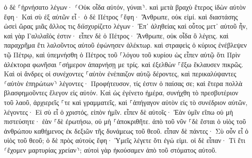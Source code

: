 \documentclass[twoside, 9pt]{extreport}
\begin{document}
ὁ δὲ ⸀ἠρνήσατο λέγων· ⸂Οὐκ οἶδα αὐτόν, γύναι⸃. 
καὶ μετὰ βραχὺ ἕτερος ἰδὼν αὐτὸν ἔφη· Καὶ σὺ ἐξ αὐτῶν εἶ· ὁ δὲ Πέτρος ⸀ἔφη· Ἄνθρωπε, οὐκ εἰμί. 
καὶ διαστάσης ὡσεὶ ὥρας μιᾶς ἄλλος τις διϊσχυρίζετο λέγων· Ἐπ᾽ ἀληθείας καὶ οὗτος μετ᾽ αὐτοῦ ἦν, καὶ γὰρ Γαλιλαῖός ἐστιν· 
εἶπεν δὲ ὁ Πέτρος· Ἄνθρωπε, οὐκ οἶδα ὃ λέγεις. καὶ παραχρῆμα ἔτι λαλοῦντος αὐτοῦ ἐφώνησεν ἀλέκτωρ. 
καὶ στραφεὶς ὁ κύριος ἐνέβλεψεν τῷ Πέτρῳ, καὶ ὑπεμνήσθη ὁ Πέτρος τοῦ ⸀λόγου τοῦ κυρίου ὡς εἶπεν αὐτῷ ὅτι Πρὶν ἀλέκτορα φωνῆσαι ⸀σήμερον ἀπαρνήσῃ με τρίς. 
καὶ ἐξελθὼν ⸀ἔξω ἔκλαυσεν πικρῶς. 
Καὶ οἱ ἄνδρες οἱ συνέχοντες ⸀αὐτὸν ἐνέπαιζον αὐτῷ δέροντες, 
καὶ περικαλύψαντες ⸂αὐτὸν ἐπηρώτων⸃ λέγοντες· Προφήτευσον, τίς ἐστιν ὁ παίσας σε; 
καὶ ἕτερα πολλὰ βλασφημοῦντες ἔλεγον εἰς αὐτόν. 
Καὶ ὡς ἐγένετο ἡμέρα, συνήχθη τὸ πρεσβυτέριον τοῦ λαοῦ, ἀρχιερεῖς ⸀τε καὶ γραμματεῖς, καὶ ⸀ἀπήγαγον αὐτὸν εἰς τὸ συνέδριον αὐτῶν, 
λέγοντες· Εἰ σὺ εἶ ὁ χριστός, εἰπὸν ἡμῖν. εἶπεν δὲ αὐτοῖς· Ἐὰν ὑμῖν εἴπω οὐ μὴ πιστεύσητε· 
ἐὰν ⸀δὲ ἐρωτήσω, οὐ μὴ ⸀ἀποκριθῆτε. 
ἀπὸ τοῦ νῦν ⸀δὲ ἔσται ὁ υἱὸς τοῦ ἀνθρώπου καθήμενος ἐκ δεξιῶν τῆς δυνάμεως τοῦ θεοῦ. 
εἶπαν δὲ πάντες· Σὺ οὖν εἶ ὁ υἱὸς τοῦ θεοῦ; ὁ δὲ πρὸς αὐτοὺς ἔφη· Ὑμεῖς λέγετε ὅτι ἐγώ εἰμι. 
οἱ δὲ εἶπαν· Τί ἔτι ⸂ἔχομεν μαρτυρίας χρείαν⸃; αὐτοὶ γὰρ ἠκούσαμεν ἀπὸ τοῦ στόματος αὐτοῦ. 
\end{document}
